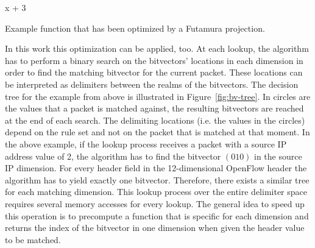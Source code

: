 \documentclass[a4paper,
		12pt,
		parskip=full,
		titlepage
		]{scrartcl}
\begin{document}
\begin{algorithm}
\begin{algorithmic}
    \State \Return x + 3
\EndFunction
\end{algorithmic}
\caption{Example function that has been optimized by a Futamura projection.}
\label{alg:futamura-f-optimized}
\end{algorithm}

In this work this optimization can be applied, too.
At each lookup, the algorithm has to perform a binary search on the bitvectors' 
locations in each dimension in order to find the matching bitvector for the current packet.
These locations can be interpreted as delimiters between the realms of the bitvectors.
The decision tree for the example from above is illustrated in Figure~\ref{fig:bv-tree}.
In circles are the values that a packet is matched against, the resulting bitvectors are reached at the end of each search. 
The delimiting locations (i.e. the values in the circles) depend on the 
rule set and not on the packet that is matched at that moment.
In the above example, if the lookup process receives a packet with a source IP 
address value of 2, the algorithm has to find the bitvector $(0 1 0)$ in the source IP dimension.
For every header field in the 12-dimensional OpenFlow header the algorithm has to yield exactly one bitvector.
Therefore, there exists a similar tree for each matching dimension.
This lookup process over the entire delimiter space requires several memory accesses for every lookup.
The general idea to speed up this operation is to precompute a function that 
is specific for each dimension and returns the index of the bitvector in one 
dimension when given the header value to be matched.
\end{document}
